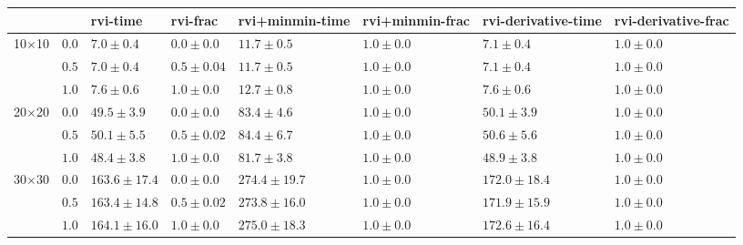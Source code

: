 \begin{tabular}{llllllll}
\toprule
 &  & rvi-time & rvi-frac & rvi+minmin-time & rvi+minmin-frac & rvi-derivative-time & rvi-derivative-frac \\
\midrule
\multirow[t]{3}{*}{10$\times$10} & $0.0$ & $7.0 \pm 0.4$ & $0.0 \pm 0.0$ & $11.7 \pm 0.5$ & $1.0 \pm 0.0$ & $7.1 \pm 0.4$ & $1.0 \pm 0.0$ \\
 & $0.5$ & $7.0 \pm 0.4$ & $0.5 \pm 0.04$ & $11.7 \pm 0.5$ & $1.0 \pm 0.0$ & $7.1 \pm 0.4$ & $1.0 \pm 0.0$ \\
 & $1.0$ & $7.6 \pm 0.6$ & $1.0 \pm 0.0$ & $12.7 \pm 0.8$ & $1.0 \pm 0.0$ & $7.6 \pm 0.6$ & $1.0 \pm 0.0$ \\
\cline{1-8}
\multirow[t]{3}{*}{20$\times$20} & $0.0$ & $49.5 \pm 3.9$ & $0.0 \pm 0.0$ & $83.4 \pm 4.6$ & $1.0 \pm 0.0$ & $50.1 \pm 3.9$ & $1.0 \pm 0.0$ \\
 & $0.5$ & $50.1 \pm 5.5$ & $0.5 \pm 0.02$ & $84.4 \pm 6.7$ & $1.0 \pm 0.0$ & $50.6 \pm 5.6$ & $1.0 \pm 0.0$ \\
 & $1.0$ & $48.4 \pm 3.8$ & $1.0 \pm 0.0$ & $81.7 \pm 3.8$ & $1.0 \pm 0.0$ & $48.9 \pm 3.8$ & $1.0 \pm 0.0$ \\
\cline{1-8}
\multirow[t]{3}{*}{30$\times$30} & $0.0$ & $163.6 \pm 17.4$ & $0.0 \pm 0.0$ & $274.4 \pm 19.7$ & $1.0 \pm 0.0$ & $172.0 \pm 18.4$ & $1.0 \pm 0.0$ \\
 & $0.5$ & $163.4 \pm 14.8$ & $0.5 \pm 0.02$ & $273.8 \pm 16.0$ & $1.0 \pm 0.0$ & $171.9 \pm 15.9$ & $1.0 \pm 0.0$ \\
 & $1.0$ & $164.1 \pm 16.0$ & $1.0 \pm 0.0$ & $275.0 \pm 18.3$ & $1.0 \pm 0.0$ & $172.6 \pm 16.4$ & $1.0 \pm 0.0$ \\
\cline{1-8}
\bottomrule
\end{tabular}
